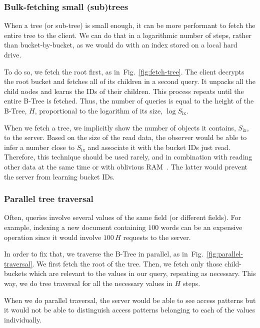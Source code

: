 \documentclass[notitlepage,longbibliography]{revtex4-1}
\newcommand{\figref}[1]{Fig.~\ref{#1}}
\begin{document}
\subsubsection{Bulk-fetching small (sub)trees}
\label{sec:bulk-fetching}

When a tree (or sub-tree) is small enough, it can be more performant to fetch the entire tree to the client.
We can do that in a logarithmic number of steps, rather than bucket-by-bucket, as we would do with an index stored on a local hard drive.

To do so, we fetch the root first, as in~\figref{fig:fetch-tree}.
The client decrypts the root bucket and fetches all of its children in a second query.
It unpacks all the child nodes and learns the IDs of their children.
This process repeats until the entire B-Tree is fetched.
Thus, the number of queries is equal to the height of the B-Tree, $H$, proportional to the logarithm of its size, $\log{S_{\mbox{ix}}}$.

When we fetch a tree, we implicitly show the number of objects it contains, $S_{\mbox{ix}}$, to the server.
Based on the size of the read data, the observer would be able to infer a number close to $S_{\mbox{ix}}$ and associate it with the bucket IDs just read.
Therefore, this technique should be used rarely, and in combination with reading other data at the same time or with oblivious RAM~\cite{path-oram,burst-oram,oram-multicloud,ods-wang-2014,practical-oram}.
The latter would prevent the server from learning bucket IDs.

\subsubsection{Parallel tree traversal}
\label{sec:parallel-traversal}

Often, queries involve several values of the same field (or different fields).
For example, indexing a new document containing $100$ words can be an expensive operation since it would involve $100\,H$ requests to the server.

In order to fix that, we traverse the B-Tree in parallel, as in~\figref{fig:parallel-traversal}.
We first fetch the root of the tree.
Then, we fetch only those child-buckets which are relevant to the values in our query, repeating as necessary.
This way, we do tree traversal for all the necessary values in $H$ steps.

When we do parallel traversal, the server would be able to see access patterns but it would not be able to distinguish access patterns belonging to each of the values individually.
\end{document}
